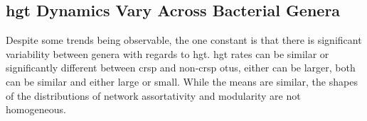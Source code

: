 \subsection{\ac{hgt} Dynamics Vary Across Bacterial Genera}
Despite some trends being observable, the one constant is that there is significant variability between genera with regards to \ac{hgt}.
\ac{hgt} rates can be similar or significantly different between \ac{crsp} and non-\ac{crsp} \ac{otu}s, either can be larger, both can be similar and either large or small.
While the means are similar, the shapes of the distributions of network assortativity and modularity are not homogeneous.
